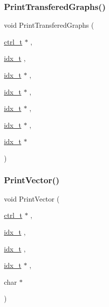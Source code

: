 \subsubsection{\texorpdfstring{Print\+Transfered\+Graphs()}{PrintTransferedGraphs()}}
{\footnotesize\ttfamily void Print\+Transfered\+Graphs (\begin{DoxyParamCaption}\item[{\hyperlink{a00742}{ctrl\+\_\+t} $\ast$}]{,  }\item[{\hyperlink{a00876_aaa5262be3e700770163401acb0150f52}{idx\+\_\+t}}]{,  }\item[{\hyperlink{a00876_aaa5262be3e700770163401acb0150f52}{idx\+\_\+t} $\ast$}]{,  }\item[{\hyperlink{a00876_aaa5262be3e700770163401acb0150f52}{idx\+\_\+t} $\ast$}]{,  }\item[{\hyperlink{a00876_aaa5262be3e700770163401acb0150f52}{idx\+\_\+t} $\ast$}]{,  }\item[{\hyperlink{a00876_aaa5262be3e700770163401acb0150f52}{idx\+\_\+t} $\ast$}]{,  }\item[{\hyperlink{a00876_aaa5262be3e700770163401acb0150f52}{idx\+\_\+t} $\ast$}]{ }\end{DoxyParamCaption})}

\mbox{\label{a00951_a5d1e6e3e93496e2e23f85e9153419fb1}} 
\subsubsection{\texorpdfstring{Print\+Vector()}{PrintVector()}}
{\footnotesize\ttfamily void Print\+Vector (\begin{DoxyParamCaption}\item[{\hyperlink{a00742}{ctrl\+\_\+t} $\ast$}]{,  }\item[{\hyperlink{a00876_aaa5262be3e700770163401acb0150f52}{idx\+\_\+t}}]{,  }\item[{\hyperlink{a00876_aaa5262be3e700770163401acb0150f52}{idx\+\_\+t}}]{,  }\item[{\hyperlink{a00876_aaa5262be3e700770163401acb0150f52}{idx\+\_\+t} $\ast$}]{,  }\item[{char $\ast$}]{ }\end{DoxyParamCaption})}

